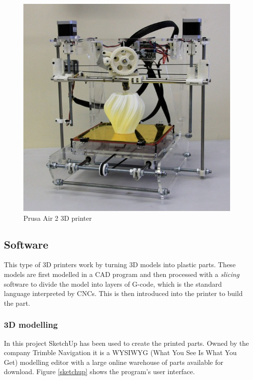 		\begin{figure}[H]
				\centering
				\includegraphics[scale=0.4]{images/ProjectComponents/tia.jpg}
				\caption{Prusa Air 2 3D printer}
				\label{tia}
			\end{figure}
			\bigskip














\subsection{Software}
	This type of 3D printers work by turning 3D models into plastic parts. These models are first modelled in a CAD program and then processed with a \textit{slicing} software to divide the model into layers of G-code, which is the standard language interpreted by CNCs. This is then introduced into the printer to build the part.

		\subsubsection{3D modelling }
		In this project SketchUp has been used to create the printed parts. Owned by the company Trimble Navigation it is a WYSIWYG (What You See Is What You Get) modelling editor with a large online warehouse of parts available for download. Figure \ref{sketchup} shows the program's user interface.\\


